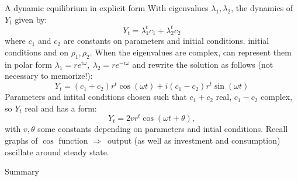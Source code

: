 \documentclass{beamer}
\newcommand{\rarr}{$\Rightarrow$\ }
\begin{document}
\begin{frame}{A dynamic equilibrium in explicit form}
  With eigenvalues $\lambda_1, \lambda_2$, the dynamics of $Y_t$ given by:
  $$
Y_t = \lambda_1^t c_1 + \lambda_2^t c_2
$$
where $ c_1 $ and $ c_2 $ are constants on parameters and initial conditions.
initial conditions and on $ \rho_1, \rho_2 $.
\vfill
When the eigenvalues are complex, can represent them in polar form $
\lambda_1 =  r e^{i \omega}, \  \lambda_2 = r e^{-i \omega}
$ and rewrite the solution as follows (\alert{not necessary to memorize!}):
$$
  Y_t =  (c_1 + c_2) r^t \cos(\omega t) + i (c_1 - c_2) r^t \sin(\omega t)
$$
Parameters and intital conditions chosen such that $c_1+c_2$ real, $c_1-c_2$ complex, so $Y_t$ real and has a form:
$$Y_t = 2 v r^t  \cos (\omega t + \theta),$$ with $v, \theta$ some constants depending on parameters and intial conditions.
\vfill
Recall graphs of $\cos$ function \rarr output (as well as investment and consumption) oscillate around steady state.
\end{frame}

\begin{frame}{Summary}
\end{frame}
\end{document}
